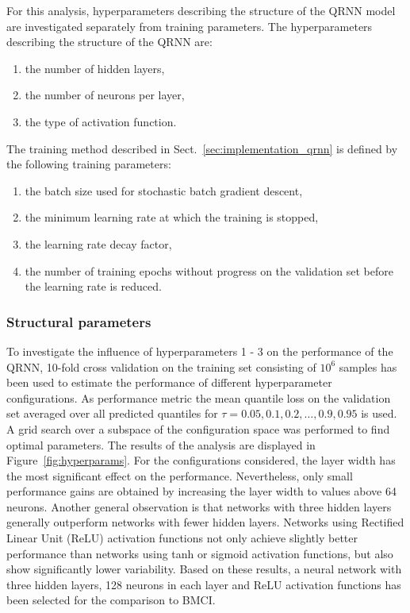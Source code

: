 \documentclass[journal abbreviation, manuscript]{copernicus}
\begin{document}
For this analysis, hyperparameters describing the structure of the QRNN model
are investigated separately from training parameters. The hyperparameters
describing the structure of the QRNN are:
\begin{enumerate}
  \item the number of hidden layers,
  \item the number of neurons per layer,
  \item the type of activation function.
  \setcounter{enumic}{\value{enumi}}
\end{enumerate}
The training method  described in Sect.~\ref{sec:implementation_qrnn} is
defined by the following training parameters:
\begin{enumerate}
  \setcounter{enumi}{\value{enumic}}
  \item the batch size used for stochastic batch gradient descent,
  \item the minimum learning rate at which the training is stopped,
  \item the learning rate decay factor,
  \item the number of training epochs without progress on the validation set
     before the learning rate is reduced.
\end{enumerate}

\subsubsection{Structural parameters}

  To investigate the influence of hyperparameters 1 - 3 on the performance of
  the QRNN, 10-fold cross validation on the training set consisting of $10^6$
  samples has been used to estimate the performance of different hyperparameter
  configurations. As performance metric the mean quantile loss on the validation
  set averaged over all predicted quantiles for $\tau = 0.05, 0.1, 0.2, \ldots,
  0.9, 0.95$ is used. A grid search over a subspace of the configuration space
  was performed to find optimal parameters. The results of the analysis are
  displayed in Figure~\ref{fig:hyperparams}. For the configurations considered,
  the layer width has the most significant effect on the performance.
  Nevertheless, only small performance gains are obtained by increasing the
  layer width to values above 64 neurons. Another general observation is that
  networks with three hidden layers generally outperform networks with fewer
  hidden layers. Networks using Rectified Linear Unit (ReLU) activation
  functions not only achieve slightly better performance than networks using
  tanh or sigmoid activation functions, but also show significantly lower
  variability. Based on these results, a neural network with three hidden
  layers, 128 neurons in each layer and ReLU activation functions has been
  selected for the comparison to BMCI.
\end{document}
